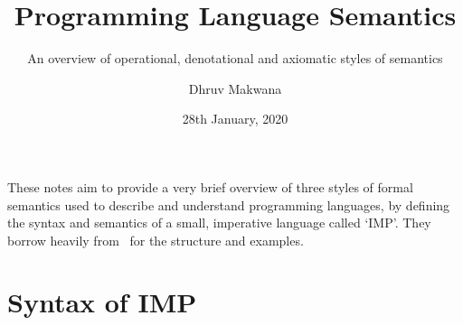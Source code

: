 \usepackage{proof}
\usepackage{ebproof}
\usepackage{listings}
\usepackage{natbib}

\title{Programming Language Semantics}
\subtitle{An overview of operational, denotational and axiomatic styles of semantics}
\date{28th January, 2020}
\author{Dhruv Makwana}

\graphicspath{{./graphics/}}


\addtolength{\jot}{0.5\baselineskip}
\setlength{\parskip}{0.5\baselineskip}

\newcommand{\den}[2]{ \mathcal{#1} [\![ #2 ]\!] }%
\newcommand{\denA}[1]{ \den{A}{#1} }%
\newcommand{\denB}[1]{ \den{B}{#1} }%
\newcommand{\denC}[1]{ \den{C}{#1} }%

\newcommand{\progNot}{\mathop{!}}
\newcommand{\doubleAmp}{\mathbin{\&\!\&}}
\newcommand{\doubleBar}{\mathbin{\mathbf{||}}}




\maketitle

\mode*  %
\setlength\parindent{0pt}

These notes aim to provide a very brief overview of three styles of formal
semantics used to describe and understand programming languages, by
defining the syntax and semantics of a small, imperative language called `IMP'.
They borrow heavily from~\citet{winskel1993formal} for the structure and
examples.

\section{Syntax of IMP}

